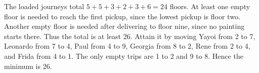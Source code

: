 The loaded journeys total $5+5+3+2+3+6=24$ floors. At least one empty floor is needed to reach the first pickup, since the lowest pickup is floor two. Another empty floor is needed after delivering to floor nine, since no painting starts there. Thus the total is at least 26. Attain it by moving Yayoi from 2 to 7, Leonardo from 7 to 4, Paul from 4 to 9, Georgia from 8 to 2, Rene from 2 to 4, and Frida from 4 to 1. The only empty trips are 1 to 2 and 9 to 8. Hence the minimum is $\boxed{26}$.
